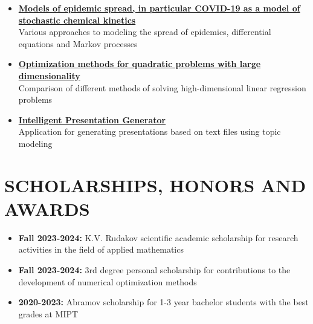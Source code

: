 \documentclass[12pt]{moderncv}
\begin{document}
        \begin{itemize}
            \item \href{https://github.com/kisnikser/Epidemic-Spread-Models}{\textbf{Models of epidemic spread, in particular COVID-19 as a model of stochastic chemical kinetics}}\\
            Various approaches to modeling the spread of epidemics, differential equations and Markov processes
            \item \href{https://github.com/kisnikser/Optimization-Methods}{\textbf{Optimization methods for quadratic problems with large dimensionality}}\\
            Comparison of different methods of solving high-dimensional linear regression problems
            \item \href{https://github.com/kisnikser/Intelligent-Presentation-Generator}{\textbf{Intelligent Presentation Generator}}\\
            Application for generating presentations based on text files using topic modeling
        \end{itemize}

    \section{SCHOLARSHIPS, HONORS AND AWARDS}

        \begin{itemize}
            \item \textbf{Fall 2023-2024:} K.V. Rudakov scientific academic scholarship for research activities in the field of applied mathematics
            \item \textbf{Fall 2023-2024:} 3rd degree personal scholarship for contributions to the development of numerical optimization methods
            \item \textbf{2020-2023:} Abramov scholarship for 1-3 year bachelor students with the best grades at MIPT
        \end{itemize}
\end{document}
